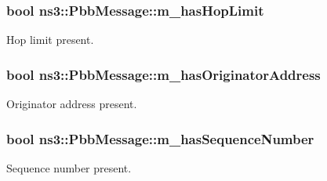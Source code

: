 \subsubsection[{\texorpdfstring{m\+\_\+has\+Hop\+Limit}{m_hasHopLimit}}]{\setlength{\rightskip}{0pt plus 5cm}bool ns3\+::\+Pbb\+Message\+::m\+\_\+has\+Hop\+Limit\hspace{0.3cm}{\ttfamily [private]}}\hypertarget{classns3_1_1PbbMessage_a1cb05b311d9c4795d1536878eadfe88b}{}\label{classns3_1_1PbbMessage_a1cb05b311d9c4795d1536878eadfe88b}


Hop limit present. 

\subsubsection[{\texorpdfstring{m\+\_\+has\+Originator\+Address}{m_hasOriginatorAddress}}]{\setlength{\rightskip}{0pt plus 5cm}bool ns3\+::\+Pbb\+Message\+::m\+\_\+has\+Originator\+Address\hspace{0.3cm}{\ttfamily [private]}}\hypertarget{classns3_1_1PbbMessage_a6af27be08950729426e800f5d7564548}{}\label{classns3_1_1PbbMessage_a6af27be08950729426e800f5d7564548}


Originator address present. 

\subsubsection[{\texorpdfstring{m\+\_\+has\+Sequence\+Number}{m_hasSequenceNumber}}]{\setlength{\rightskip}{0pt plus 5cm}bool ns3\+::\+Pbb\+Message\+::m\+\_\+has\+Sequence\+Number\hspace{0.3cm}{\ttfamily [private]}}\hypertarget{classns3_1_1PbbMessage_ad8968487e915d6cb78ca315863d0eada}{}\label{classns3_1_1PbbMessage_ad8968487e915d6cb78ca315863d0eada}


Sequence number present. 

